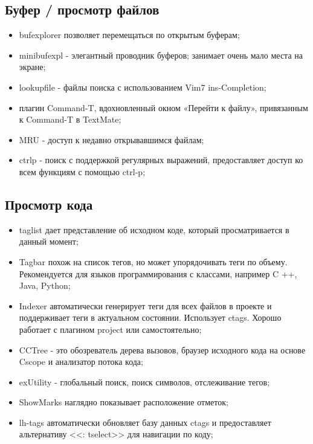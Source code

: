 \subsection{Буфер / просмотр файлов}
\begin{itemize}
    \item bufexplorer позволяет перемещаться по открытым буферам;\\
    \item minibufexpl - элегантный проводник буферов; занимает очень мало места на экране;\\
    \item lookupfile - файлы поиска с использованием Vim7 ins-Completion;\\
    \item плагин Command-T, вдохновленный окном «Перейти к файлу», привязанным к Command-T в 
        TextMate;\\
    \item MRU - доступ к недавно открывавшимся файлам;\\
    \item ctrlp -  поиск с поддержкой регулярных выражений, предоставляет доступ ко всем функциям 
        с помощью ctrl-p;\\
\end{itemize}

\subsection{Просмотр кода}
\begin{itemize}
    \item taglist дает представление об исходном коде, который просматривается в данный момент;\\
    \item Tagbar похож на список тегов, но может упорядочивать теги по объему. Рекомендуется для 
        языков программирования с классами, например C ++, Java, Python;\\
    \item Indexer автоматически генерирует теги для всех файлов в проекте и поддерживает теги в 
        актуальном состоянии. Использует ctags. Хорошо работает с плагином project или 
        самостоятельно;\\
    \item CCTree - это обозреватель дерева вызовов, браузер исходного кода на основе Cscope и 
        анализатор потока кода;\\
    \item exUtility - глобальный поиск, поиск символов, отслеживание тегов;\\
    \item ShowMarks наглядно показывает расположение отметок;\\
    \item lh-tags автоматически обновляет базу данных ctags и предоставляет альтернативу 
        <<: tselect>> для навигации по коду;\\
\end{itemize}

